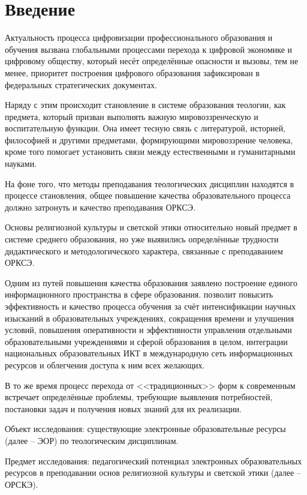 \tableofcontents
\newpage
\large
\section*{Введение}
Актуальность процесса цифровизации профессионального образования и обучения вызвана глобальными процессами перехода к цифровой экономике и цифровому обществу, который несёт определённые опасности и вызовы, тем не менее, приоритет построения цифрового образования зафиксирован в федеральных стратегических документах\cite{fsd}. 

Наряду с этим происходит становление в системе образования теологии, как предмета, который призван выполнять важную мировоззренческую и воспитательную функции. Она имеет тесную связь с литературой, историей, философией и другими предметами, формирующими мировоззрение человека, кроме того помогает установить связи между естественными и гуманитарными науками.

На фоне того, что методы преподавания теологических дисциплин находятся в процессе становления, общее повышение качества образовательного процесса должно затронуть и качество преподавания ОРКСЭ.

Основы религиозной культуры и светской этики относительно новый предмет в системе среднего образования, но уже выявились определённые трудности дидактического и методологического характера, связанные с преподаванием ОРКСЭ. 

Одним из путей повышения качества образования заявлено построение единого информационного пространства в сфере образования. позволит повысить эффективность и качество процесса обучения за счёт интенсификации научных изысканий в образовательных учреждениях, сокращения времени и улучшения условий, повышения оперативности и эффективности управления отдельными образовательными учреждениями и сферой образования в целом, интеграции национальных образовательных ИКТ в международную сеть информационных ресурсов и облегчения доступа к ним всех желающих.

В то же время процесс перехода от <<традиционных>> форм к современным встречает определённые проблемы, требующие выявления потребностей, постановки задач и получения новых знаний для их реализации.

Объект исследования: \label{obj} существующие электронные образовательные ресурсы (далее – ЭОР) по теологическим дисциплинам.

Предмет исследования: \label{subj} педагогический потенциал электронных образовательных ресурсов в преподавании основ религиозной культуры и светской этики (далее – ОРСКЭ). 

